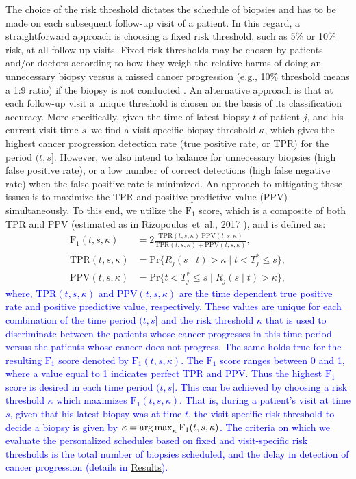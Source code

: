 The choice of the risk threshold dictates the schedule of biopsies and has to be made on each subsequent follow-up visit of a patient. In this regard, a straightforward approach is choosing a fixed risk threshold, such as 5\% or 10\% risk, at all follow-up visits. Fixed risk thresholds may be chosen by patients and/or doctors according to how they weigh the relative harms of doing an unnecessary biopsy versus a missed cancer progression (e.g., 10\% threshold means a 1:9 ratio) if the biopsy is not conducted \cite{vickers2006decision}. An alternative approach is that at each follow-up visit a unique threshold is chosen on the basis of its classification accuracy. More specifically, given the time of latest biopsy $t$ of patient $j$, and his current visit time $s$\, we find a visit-specific biopsy threshold $\kappa$, which gives the highest cancer progression detection rate (true positive rate, or TPR) for the period $(t, s]$. However, we also intend to balance for unnecessary biopsies (high false positive rate), or a low number of correct detections (high false negative rate) when the false positive rate is minimized. An approach to mitigating these issues is to maximize the TPR and positive predictive value (PPV) simultaneously. To this end, we utilize the $\mbox{F}_1$ score, which is a composite of both TPR and PPV (estimated as in Rizopoulos~et~al., 2017 \cite{landmarking2017}), and is defined as: 
\begin{equation}
\label{eq:F1_TPR_PPV}
\begin{split}
\mbox{F}_1(t,  s, \kappa) &= 2\frac{\mbox{TPR}(t,  s, \kappa)\ \mbox{PPV}(t,  s, \kappa)}{\mbox{TPR}(t,  s, \kappa) + \mbox{PPV}(t,  s, \kappa)},\\
\mbox{TPR}(t,  s, \kappa) &= \mbox{Pr}\big\{R_j(s \mid t) > \kappa \mid t < T^*_j \leq s\big\},\\
\mbox{PPV}(t,  s, \kappa) &= \mbox{Pr}\big\{t < T^*_j \leq s \mid R_j(s \mid t) > \kappa \big\},
\end{split}
\end{equation}
\textcolor{blue}{where, $\mbox{TPR}(t,  s, \kappa)$ and $\mbox{PPV}(t,  s, \kappa)$ are the time dependent true positive rate and positive predictive value, respectively. These values are unique for each combination of the time period $(t, s]$ and the risk threshold $\kappa$ that is used to discriminate between the patients whose cancer progresses in this time period versus the patients whose cancer does not progress. The same holds true for the resulting $\mbox{F}_1$ score denoted by $\mbox{F}_1(t,  s, \kappa)$. The $\mbox{F}_1$ score ranges between 0 and 1, where a value equal to 1 indicates perfect TPR and PPV. Thus the highest $\mbox{F}_1$ score is desired in each time period $(t, s]$. This can be achieved by choosing a risk threshold $\kappa$ which maximizes $\mbox{F}_1(t, s, \kappa)$. That is, during a patient's visit at time $s$, given that his latest biopsy was at time $t$, the visit-specific risk threshold to decide a biopsy is given by ${\kappa=\operatorname{arg\,max}_{\kappa} \mbox{F}_1(t, s, \kappa)}$. The criteria on which we evaluate the personalized schedules based on fixed and visit-specific risk thresholds is the total number of biopsies scheduled, and the delay in detection of cancer progression (details in \hyperref[sec:results]{Results}).}